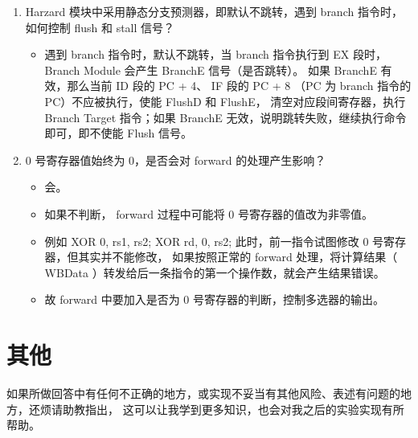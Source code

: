 \documentclass[UTF8]{article}
\begin{document}
\begin{enumerate}
    \item Harzard 模块中采用静态分支预测器，即默认不跳转，遇到 branch 指令时，如何控制 flush 和 stall 信号？
    
    \begin{itemize}
        \item 遇到 branch 指令时，默认不跳转，当 branch 指令执行到 EX 段时， Branch Module 会产生 BranchE 信号（是否跳转）。
        如果 BranchE 有效，那么当前 ID 段的 PC + 4、 IF 段的 PC + 8 （PC 为 branch 指令的 PC）不应被执行，使能 FlushD 和 FlushE，
        清空对应段间寄存器，执行 Branch Target 指令；如果 BranchE 无效，说明跳转失败，继续执行命令即可，即不使能 Flush 信号。
    \end{itemize}
    
    \item 0 号寄存器值始终为 0，是否会对 forward 的处理产生影响？
    
    \begin{itemize}
        \item 会。
        \item 如果不判断， forward 过程中可能将 0 号寄存器的值改为非零值。
        \item 例如 XOR 0, rs1, rs2; XOR rd, 0, rs2; 此时，前一指令试图修改 0 号寄存器，但其实并不能修改，
        如果按照正常的 forward 处理，将计算结果（ WBData ）转发给后一条指令的第一个操作数，就会产生结果错误。
        \item 故 forward 中要加入是否为 0 号寄存器的判断，控制多选器的输出。
    \end{itemize}
    
\end{enumerate}

\section*{其他}

\noindent
如果所做回答中有任何不正确的地方，或实现不妥当有其他风险、表述有问题的地方，还烦请助教指出，
这可以让我学到更多知识，也会对我之后的实验实现有所帮助。
\end{document}

